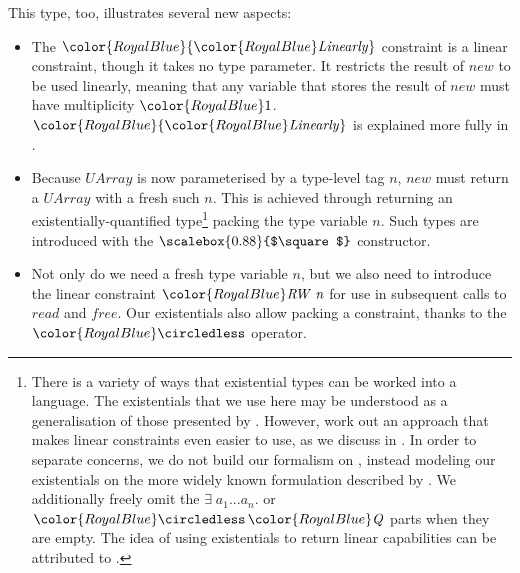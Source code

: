 \documentclass[acmsmall,usenames,dvipsnames,natbib=false,acmthm=false,screen]{acmart}
\newcommand{\Conid}[1]{\mathit{#1}}
\newcommand{\Varid}[1]{\mathit{#1}}
\newcommand{\constraintcolour}{\color{RoyalBlue}}
\newcommand{\constraintfont}[1]{{\constraintcolour#1}}
\newcommand{\multiplicitycolour}{\color{RoyalBlue}}
\newcommand{\multiplicityfont}[1]{{\multiplicitycolour#1}}
\newcommand{\RLolly}{\mathop{\constraintfont \circledless}}
\newcommand{\keyword}[1]{\mathbf{#1}}
\newcommand{\packbox}{\raisebox{-0.08ex}{\scalebox{0.88}{$\square$}}}
\theoremstyle{acmplain}
\theoremstyle{acmdefinition}
\begin{document}
This type, too, illustrates several new aspects:
\begin{itemize}
\item The \ensuremath{\constraintfont{\constraintfont{\Conid{Linearly}}}} constraint is a linear constraint, though
it takes no type parameter. It restricts the result of \ensuremath{\Varid{new}}
to be used linearly, meaning that any variable that stores the result of \ensuremath{\Varid{new}} must
have multiplicity $  \multiplicityfont{ \ottsym{1} }  $. \ensuremath{\constraintfont{\constraintfont{\Conid{Linearly}}}} is explained more fully in .

\item Because \ensuremath{\Conid{UArray}} is now parameterised by a type-level tag \ensuremath{\Varid{n}}, \ensuremath{\Varid{new}} must
return a \ensuremath{\Conid{UArray}} with a fresh such \ensuremath{\Varid{n}}. This is achieved through returning an
existentially-quantified type\footnote{There is a variety of ways that existential types can
  be worked into a language. The existentials that we use here may be understood
  as a generalisation of those presented by \citet[Chapter
  24]{tapl}.
  However, \citet{existentials} work out an
  approach that makes linear constraints even easier to use, as we
  discuss in . In order to separate
  concerns, we do not build our formalism on \citet{existentials},
  instead modeling our existentials on the more widely known formulation described by \citet{tapl}.
  We additionally freely
omit the \ensuremath{\exists\;\Varid{a}_{1}\mathbin{...}\Varid{a}_{\Varid{n}}.} or \ensuremath{\RLolly\constraintfont{\Conid{Q}}} parts when they are
empty.
  The idea of using existentials to return linear capabilities can be attributed to \citet{DBLP:conf/esop/FluetMA06}.
} packing the type variable \ensuremath{\Varid{n}}. Such types are introduced with the $\packbox$ constructor.

\item Not only do we need a fresh type variable \ensuremath{\Varid{n}}, but we also need to introduce
the linear constraint \ensuremath{\constraintfont{\Conid{RW}\;\Varid{n}}} for use in subsequent calls to \ensuremath{\Varid{read}} and \ensuremath{\Varid{free}}.
Our existentials also allow packing a constraint, thanks to the \ensuremath{\RLolly} operator.
\end{itemize}
\end{document}
